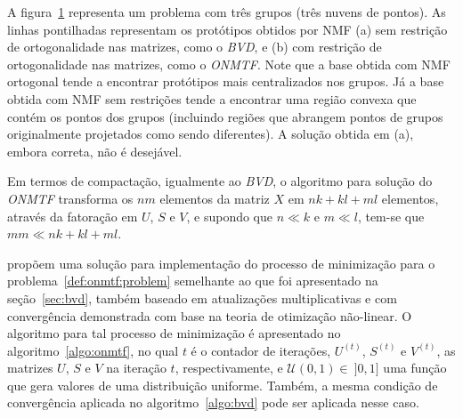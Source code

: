 \documentclass[
    12pt,                %
    oneside,            %
    a4paper,            %
    english,            %
    brazil                %
    ]{abntex2ppgsi}
\begin{document}
\begin{figure} [htpb]

\label{fig:bvdvsonmtf}
\end{figure}

A figura~\ref{fig:bvdvsonmtf} representa um problema com três grupos (três nuvens de pontos).
As linhas pontilhadas representam os protótipos obtidos por NMF (a) sem restrição de ortogonalidade nas matrizes, como o \textit{BVD}, e (b) com restrição de ortogonalidade nas matrizes, como o \textit{ONMTF}.
Note que a base obtida com NMF ortogonal tende a encontrar protótipos mais centralizados nos grupos.
Já a base obtida com NMF sem restrições tende a encontrar uma região convexa que contém os pontos dos grupos (incluindo regiões que abrangem pontos de grupos originalmente projetados como sendo diferentes).
A solução obtida em (a), embora correta, não é desejável.

Em termos de compactação, igualmente ao \textit{BVD}, o algoritmo para solução do \textit{ONMTF} transforma os $nm$ elementos da matriz $X$ em $nk + kl + ml$ elementos, através da fatoração em $U$, $S$ e $V$, e supondo que $n \ll k$ e $m \ll l$, tem-se que $mm \ll nk + kl + ml$.

 propõem uma solução para implementação do processo de minimização para o problema~\ref{def:onmtf:problem} semelhante ao que foi apresentado na seção~\ref{sec:bvd}, também baseado em atualizações multiplicativas e com convergência demonstrada com base na teoria de otimização não-linear.
O algoritmo para tal processo de minimização é apresentado no algoritmo~\ref{algo:onmtf}, no qual $t$ é o contador de iterações, $U^{(t)}$, $S^{(t)}$ e $V^{(t)}$, as matrizes $U$, $S$ e $V$ na iteração $t$, respectivamente, e $\mathcal{U}(0, 1) \in~]0, 1]$ uma função que gera valores de uma distribuição uniforme.
Também, a mesma condição de convergência aplicada no algoritmo~\ref{algo:bvd} pode ser aplicada nesse caso.
\end{document}
